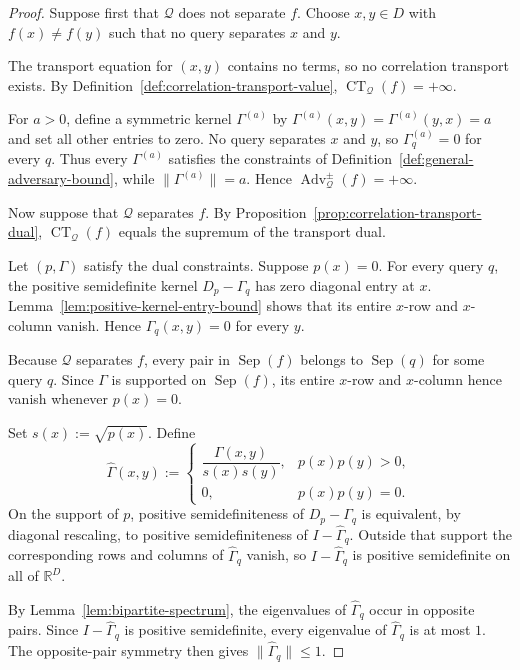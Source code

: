 \documentclass[11pt]{article}
\numberwithin{equation}{section}
\theoremstyle{remark}
\begin{document}
\begin{proof}
Suppose first that $\mathcal Q$ does not separate $f$. Choose
$x,y\in D$ with $f(x)\neq f(y)$ such that no query separates $x$ and $y$.

The transport equation for $(x,y)$ contains no terms, so no correlation
transport exists. By
Definition~\ref{def:correlation-transport-value},
$\operatorname{CT}_{\mathcal Q}(f)=+\infty$.

For $a>0$, define a symmetric kernel $\Gamma^{(a)}$ by
$\Gamma^{(a)}(x,y)=\Gamma^{(a)}(y,x)=a$ and set all other entries to zero.
No query separates $x$ and $y$, so $\Gamma_q^{(a)}=0$ for every $q$.
Thus every $\Gamma^{(a)}$ satisfies the constraints of
Definition~\ref{def:general-adversary-bound}, while
$\|\Gamma^{(a)}\|=a$. Hence
$\operatorname{Adv}^{\pm}_{\mathcal Q}(f)=+\infty$.

Now suppose that $\mathcal Q$ separates $f$. By
Proposition~\ref{prop:correlation-transport-dual},
$\operatorname{CT}_{\mathcal Q}(f)$ equals the supremum of the transport
dual.

Let $(p,\Gamma)$ satisfy the dual constraints. Suppose $p(x)=0$. For every query $q$, the positive semidefinite kernel $D_p-\Gamma_q$ has zero diagonal entry at $x$. Lemma~\ref{lem:positive-kernel-entry-bound} shows that its entire $x$-row and $x$-column vanish. Hence $\Gamma_q(x,y)=0$ for every $y$.

Because $\mathcal Q$ separates $f$, every pair in
$\operatorname{Sep}(f)$ belongs to $\operatorname{Sep}(q)$ for some query
$q$. Since $\Gamma$ is supported on $\operatorname{Sep}(f)$, its entire
$x$-row and $x$-column hence vanish whenever $p(x)=0$.

Set $s(x):=\sqrt{p(x)}$. Define
\begin{equation}
    \widehat\Gamma(x,y)
    :=
    \begin{cases}
        \dfrac{\Gamma(x,y)}{s(x)s(y)},
        &p(x)p(y)>0,\\[1.2ex]
        0,
        &p(x)p(y)=0.
    \end{cases}
\end{equation}
On the support of $p$, positive semidefiniteness of $D_p-\Gamma_q$ is equivalent, by
diagonal rescaling, to positive semidefiniteness of $I-\widehat\Gamma_q$. Outside that
support the corresponding rows and columns of $\widehat\Gamma_q$ vanish, so
$I-\widehat\Gamma_q$ is positive semidefinite on all of $\mathbb R^D$.

By Lemma~\ref{lem:bipartite-spectrum}, the eigenvalues of
$\widehat\Gamma_q$ occur in opposite pairs. Since
$I-\widehat\Gamma_q$ is positive semidefinite, every eigenvalue of
$\widehat\Gamma_q$ is at most $1$. The opposite-pair symmetry then gives
$\|\widehat\Gamma_q\|\leq1$.


\end{proof}
\end{document}
